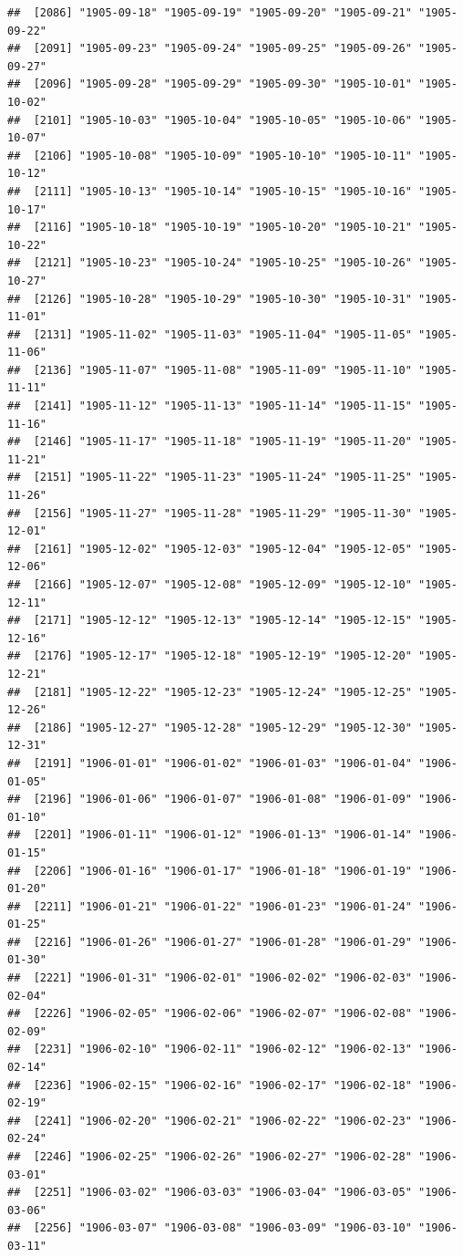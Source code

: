 \documentclass{article}\usepackage[]{graphicx}\usepackage[]{color}
\makeatletter
\newenvironment{kframe}{%
 \def\at@end@of@kframe{}%
 \ifinner\ifhmode%
  \def\at@end@of@kframe{\end{minipage}}%
  \begin{minipage}{\columnwidth}%
 \fi\fi%
 \def\FrameCommand##1{\hskip\@totalleftmargin \hskip-\fboxsep
 \colorbox{shadecolor}{##1}\hskip-\fboxsep
     \hskip-\linewidth \hskip-\@totalleftmargin \hskip\columnwidth}%
 \MakeFramed {\advance\hsize-\width
   \@totalleftmargin\z@ \linewidth\hsize
   \@setminipage}}%
 {\par\unskip\endMakeFramed%
 \at@end@of@kframe}
\newenvironment{knitrout}{}{} %
\makeatother
\begin{document}
\begin{description}
\begin{knitrout}
\begin{kframe}
\begin{verbatim}
##  [2086] "1905-09-18" "1905-09-19" "1905-09-20" "1905-09-21" "1905-09-22"
##  [2091] "1905-09-23" "1905-09-24" "1905-09-25" "1905-09-26" "1905-09-27"
##  [2096] "1905-09-28" "1905-09-29" "1905-09-30" "1905-10-01" "1905-10-02"
##  [2101] "1905-10-03" "1905-10-04" "1905-10-05" "1905-10-06" "1905-10-07"
##  [2106] "1905-10-08" "1905-10-09" "1905-10-10" "1905-10-11" "1905-10-12"
##  [2111] "1905-10-13" "1905-10-14" "1905-10-15" "1905-10-16" "1905-10-17"
##  [2116] "1905-10-18" "1905-10-19" "1905-10-20" "1905-10-21" "1905-10-22"
##  [2121] "1905-10-23" "1905-10-24" "1905-10-25" "1905-10-26" "1905-10-27"
##  [2126] "1905-10-28" "1905-10-29" "1905-10-30" "1905-10-31" "1905-11-01"
##  [2131] "1905-11-02" "1905-11-03" "1905-11-04" "1905-11-05" "1905-11-06"
##  [2136] "1905-11-07" "1905-11-08" "1905-11-09" "1905-11-10" "1905-11-11"
##  [2141] "1905-11-12" "1905-11-13" "1905-11-14" "1905-11-15" "1905-11-16"
##  [2146] "1905-11-17" "1905-11-18" "1905-11-19" "1905-11-20" "1905-11-21"
##  [2151] "1905-11-22" "1905-11-23" "1905-11-24" "1905-11-25" "1905-11-26"
##  [2156] "1905-11-27" "1905-11-28" "1905-11-29" "1905-11-30" "1905-12-01"
##  [2161] "1905-12-02" "1905-12-03" "1905-12-04" "1905-12-05" "1905-12-06"
##  [2166] "1905-12-07" "1905-12-08" "1905-12-09" "1905-12-10" "1905-12-11"
##  [2171] "1905-12-12" "1905-12-13" "1905-12-14" "1905-12-15" "1905-12-16"
##  [2176] "1905-12-17" "1905-12-18" "1905-12-19" "1905-12-20" "1905-12-21"
##  [2181] "1905-12-22" "1905-12-23" "1905-12-24" "1905-12-25" "1905-12-26"
##  [2186] "1905-12-27" "1905-12-28" "1905-12-29" "1905-12-30" "1905-12-31"
##  [2191] "1906-01-01" "1906-01-02" "1906-01-03" "1906-01-04" "1906-01-05"
##  [2196] "1906-01-06" "1906-01-07" "1906-01-08" "1906-01-09" "1906-01-10"
##  [2201] "1906-01-11" "1906-01-12" "1906-01-13" "1906-01-14" "1906-01-15"
##  [2206] "1906-01-16" "1906-01-17" "1906-01-18" "1906-01-19" "1906-01-20"
##  [2211] "1906-01-21" "1906-01-22" "1906-01-23" "1906-01-24" "1906-01-25"
##  [2216] "1906-01-26" "1906-01-27" "1906-01-28" "1906-01-29" "1906-01-30"
##  [2221] "1906-01-31" "1906-02-01" "1906-02-02" "1906-02-03" "1906-02-04"
##  [2226] "1906-02-05" "1906-02-06" "1906-02-07" "1906-02-08" "1906-02-09"
##  [2231] "1906-02-10" "1906-02-11" "1906-02-12" "1906-02-13" "1906-02-14"
##  [2236] "1906-02-15" "1906-02-16" "1906-02-17" "1906-02-18" "1906-02-19"
##  [2241] "1906-02-20" "1906-02-21" "1906-02-22" "1906-02-23" "1906-02-24"
##  [2246] "1906-02-25" "1906-02-26" "1906-02-27" "1906-02-28" "1906-03-01"
##  [2251] "1906-03-02" "1906-03-03" "1906-03-04" "1906-03-05" "1906-03-06"
##  [2256] "1906-03-07" "1906-03-08" "1906-03-09" "1906-03-10" "1906-03-11"

\end{verbatim}
\end{kframe}
\end{knitrout}
\end{description}
\end{document}
